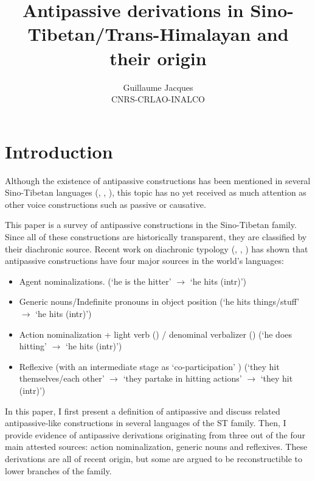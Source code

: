 \documentclass[oneside,a4paper,11pt]{article}
\begin{document}
 
\title{Antipassive derivations in Sino-Tibetan/Trans-Himalayan and their origin}
\author{Guillaume Jacques\\ CNRS-CRLAO-INALCO}
\maketitle

\section*{Introduction}
Although the existence of antipassive constructions has been mentioned in several Sino-Tibetan languages (\citealt[225-7]{doornenbal09}, \citealt{jacques14antipassive}, \citealt{bickel15antipassive}), this topic has no yet received as much attention as other voice constructions such as passive or causative.

This paper is a survey of antipassive constructions in the Sino-Tibetan family. Since all of these constructions are historically transparent, they are classified by their diachronic source. Recent work on diachronic typology (\citealt[235]{janic.these},  \citealt{jacques14antipassive}, \citealt{sanso17antipassive}) has shown that antipassive constructions have four major sources in the world's languages:
\begin{itemize}
\item Agent nominalizations. (`he is the hitter' $\rightarrow$  `he hits (intr)')
\item Generic nouns/Indefinite pronouns in object position  (`he hits things/stuff' $\rightarrow$  `he hits (intr)')
\item Action nominalization + light verb (\citealt{creissels12antip}) / denominal verbalizer (\citealt{jacques14antipassive}) (`he does hitting' $\rightarrow$  `he hits (intr)')
\item Reflexive (with an intermediate stage as `co-participation' \citet{creissels08coparticipation}) (`they hit themselves/each other' $\rightarrow$  `they partake in hitting actions' $\rightarrow$  `they hit (intr)')
\end{itemize}

In this paper, I first present a definition of antipassive and discuss related antipassive-like constructions in several languages of the ST family. Then, I provide evidence of antipassive derivations originating from three out of the four main attested sources: action nominalization, generic nouns and reflexives. These derivations are all of recent origin, but some are argued to be reconstructible to lower branches of the family.
\end{document}
